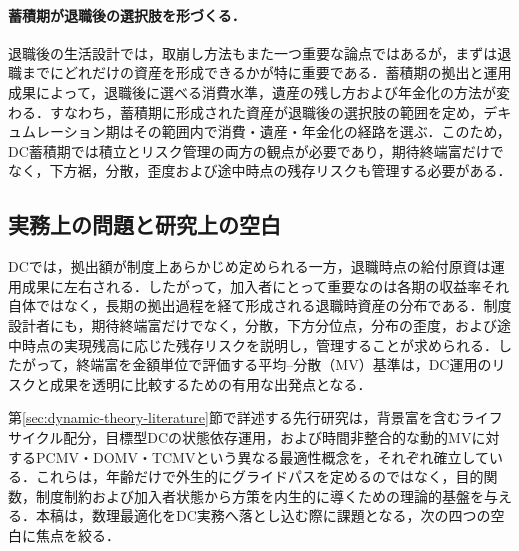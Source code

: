 \documentclass[10pt,a4paper]{article}
\theoremstyle{plain}
\theoremstyle{definition}
\begin{document}
\paragraph{蓄積期が退職後の選択肢を形づくる．}
退職後の生活設計では，取崩し方法もまた一つ重要な論点ではあるが，まずは退職までにどれだけの資産を形成できるかが特に重要である．蓄積期の拠出と運用成果によって，退職後に選べる消費水準，遺産の残し方および年金化の方法が変わる．すなわち，蓄積期に形成された資産が退職後の選択肢の範囲を定め，デキュムレーション期はその範囲内で消費・遺産・年金化の経路を選ぶ．このため，DC蓄積期では積立とリスク管理の両方の観点が必要であり，期待終端富だけでなく，下方裾，分散，歪度および途中時点の残存リスクも管理する必要がある．

\subsection{実務上の問題と研究上の空白}

DCでは，拠出額が制度上あらかじめ定められる一方，退職時点の給付原資は運用成果に左右される．したがって，加入者にとって重要なのは各期の収益率それ自体ではなく，長期の拠出過程を経て形成される退職時資産の分布である．制度設計者にも，期待終端富だけでなく，分散，下方分位点，分布の歪度，および途中時点の実現残高に応じた残存リスクを説明し，管理することが求められる．したがって，終端富を金額単位で評価する平均--分散（MV）基準は，DC運用のリスクと成果を透明に比較するための有用な出発点となる．

第\ref{sec:dynamic-theory-literature}節で詳述する先行研究は，背景富を含むライフサイクル配分，目標型DCの状態依存運用，および時間非整合的な動的MVに対するPCMV・DOMV・TCMVという異なる最適性概念を，それぞれ確立している．これらは，年齢だけで外生的にグライドパスを定めるのではなく，目的関数，制度制約および加入者状態から方策を内生的に導くための理論的基盤を与える．本稿は，数理最適化をDC実務へ落とし込む際に課題となる，次の四つの空白に焦点を絞る．
\end{document}
